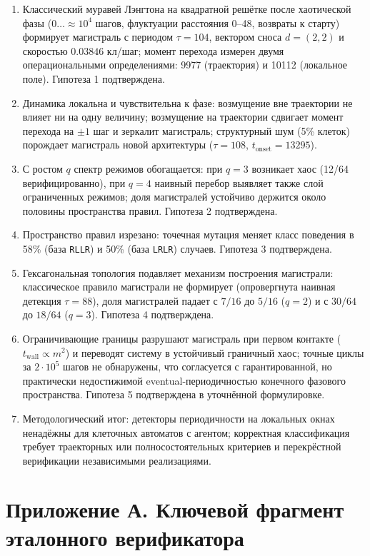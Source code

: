 \documentclass[12pt,a4paper]{article}
\begin{document}
	\begin{enumerate}
		\item Классический муравей Лэнгтона на квадратной решётке после хаотической фазы ($0\dots{\approx}10^4$ шагов, флуктуации расстояния 0--48, возвраты к старту) формирует магистраль с периодом $\tau=104$, вектором сноса $d=(2,2)$ и скоростью $0.03846$ кл/шаг; момент перехода измерен двумя операциональными определениями: 9977 (траектория) и 10112 (локальное поле). Гипотеза 1 подтверждена.
		\item Динамика локальна и чувствительна к фазе: возмущение вне траектории не влияет ни на одну величину; возмущение на траектории сдвигает момент перехода на $\pm1$ шаг и зеркалит магистраль; структурный шум (5\% клеток) порождает магистраль новой архитектуры ($\tau=108$, $t_{\mathrm{onset}}=13295$).
		\item С ростом $q$ спектр режимов обогащается: при $q=3$ возникает хаос (12/64 верифицированно), при $q=4$ наивный перебор выявляет также слой ограниченных режимов; доля магистралей устойчиво держится около половины пространства правил. Гипотеза 2 подтверждена.
		\item Пространство правил изрезано: точечная мутация меняет класс поведения в 58\% (база \texttt{RLLR}) и 50\% (база \texttt{LRLR}) случаев. Гипотеза 3 подтверждена.
		\item Гексагональная топология подавляет механизм построения магистрали: классическое правило магистрали не формирует (опровергнута наивная детекция $\tau=88$), доля магистралей падает с $7/16$ до $5/16$ ($q=2$) и с $30/64$ до $18/64$ ($q=3$). Гипотеза 4 подтверждена.
		\item Ограничивающие границы разрушают магистраль при первом контакте ($t_{\mathrm{wall}}\propto m^2$) и переводят систему в устойчивый граничный хаос; точные циклы за $2\cdot10^5$ шагов не обнаружены, что согласуется с гарантированной, но практически недостижимой eventual-периодичностью конечного фазового пространства. Гипотеза 5 подтверждена в уточнённой формулировке.
		\item Методологический итог: детекторы периодичности на локальных окнах ненадёжны для клеточных автоматов с агентом; корректная классификация требует траекторных или полносостоятельных критериев и перекрёстной верификации независимыми реализациями.
	\end{enumerate}
	

	
	\newpage
	\appendix
	\section{Приложение А. Ключевой фрагмент эталонного верификатора}
	
\end{document}

